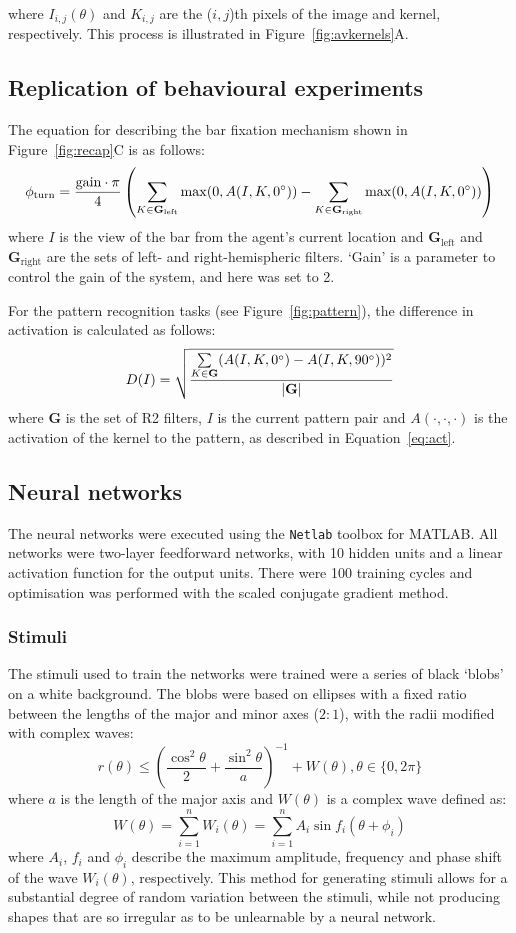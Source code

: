 \documentclass[10pt]{article}
\newcommand{\Matlab}{MATLAB}
\begin{document}
where $I_{i,j}(\theta)$ and $K_{i,j}$ are the ($i,j$)th pixels of the image and kernel, respectively. This process is illustrated in Figure~\ref{fig:avkernels}A.

\subsection*{Replication of behavioural experiments}
\label{sec:methods:replication}
The equation for describing the bar fixation mechanism shown in Figure~\ref{fig:recap}C is as follows:
$$
\phi_\mathrm{turn} = \frac{\mathrm{gain}\cdot \pi}{4}\left( \sum\limits_{K\in \mathbf{G}_\mathrm{left}}\max(0,A(I,K,0\degree)) - \sum\limits_{K\in \mathbf{G}_\mathrm{right}}\max(0,A(I,K,0\degree)) \right)
$$
where $I$ is the view of the bar from the agent's current location and $\mathbf{G}_\mathrm{left}$ and $\mathbf{G}_\mathrm{right}$ are the sets of left- and right-hemispheric filters. `Gain' is a parameter to control the gain of the system, and here was set to 2.

For the pattern recognition tasks (see Figure~\ref{fig:pattern}), the difference in activation is calculated as follows:
$$
D(I) = \sqrt{\frac{\sum\limits_{K\in \mathbf{G}}(A(I,K,0\degree)-A(I,K,90\degree))^2}{|\mathbf{G}|}}
$$
where $\mathbf{G}$ is the set of R2 filters, $I$ is the current pattern pair and $A(\cdot,\cdot,\cdot)$ is the activation of the kernel to the pattern, as described in Equation~\ref{eq:act}.

\subsection*{Neural networks}
\label{sec:methods:neuralnetworks}
The neural networks were executed using the \texttt{Netlab} toolbox for \Matlab.
All networks were two-layer feedforward networks, with 10 hidden units and a linear activation function for the output units.
There were 100 training cycles and optimisation was performed with the scaled conjugate gradient method.

\subsubsection*{Stimuli}
\label{sec:methods:stimuli}
The stimuli used to train the networks were trained were a series of black `blobs' on a white background.
The blobs were based on ellipses with a fixed ratio between the lengths of the major and minor axes ($2:1$), with the radii modified with complex waves:
$$
r(\theta) \le \left(\frac{\cos^2 \theta}{2} + \frac{\sin^2 \theta}{a} \right)^{-1} + W(\theta), \theta \in \{0, 2\pi\}
$$
where $a$ is the length of the major axis and $W(\theta)$ is a complex wave defined as:
$$
W(\theta) = \sum_{i=1}^n W_i(\theta) = \sum_{i=1}^n A_i \sin f_i (\theta+\phi_i) 
$$
where $A_i$, $f_i$ and $\phi_i$ describe the maximum amplitude, frequency and phase shift of the wave $W_i(\theta)$, respectively.
This method for generating stimuli allows for a substantial degree of random variation between the stimuli, while not producing shapes that are so irregular as to be unlearnable by a neural network.
\end{document}

